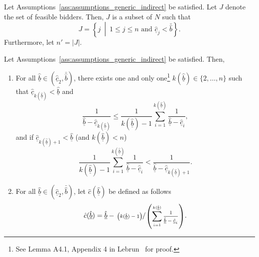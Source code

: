 \begin{define}
\label{def:feasible_bidders_indirect}
Let Assumptions~\ref{ass:assumptions_generic_indirect} be satisfied. Let $J$ denote the set of feasible bidders. Then, $J$ is a subset of $N$ such that
\begin{equation*}
  J = \left\{j \:\middle\vert\: 1\leq j\leq n \textrm{ and } \underline{\hat{c}}_j < \bar{\hat{b}}\right\}.
\end{equation*}
Furthermore, let $n' = |J|$.
\end{define}

\begin{define}
\label{def:lower_bound_bids_indirect}
Let Assumptions~\ref{ass:assumptions_generic_indirect} be satisfied. Then,
\begin{enumerate}
  \item For all $\underline{\hat{b}}\in (\underline{\hat{c}}_2, \bar{\hat{b}})$, there exists one and only one\footnote{See Lemma A4.1, Appendix 4 in Lebrun~\cite{Lebrun2004} for proof.} $k(\underline{\hat{b}})\in \{2,\dotsc,n\}$ such that $\underline{\hat{c}}_{k(\underline{\hat{b}})} < \underline{\hat{b}}$ and
  \begin{equation*}
    \frac{1}{\underline{\hat{b}} - \underline{\hat{c}}_{k(\underline{\hat{b}})}}\leq \frac{1}{k(\underline{\hat{b}}) - 1}\sum_{i=1}^{k(\underline{\hat{b}})}\frac{1}{\underline{\hat{b}} - \underline{\hat{c}}_i},
  \end{equation*}
  and if $\underline{\hat{c}}_{k(\underline{\hat{b}})+1} < \underline{\hat{b}}$ (and $k(\underline{\hat{b}}) < n$)
  \begin{equation*}
    \frac{1}{k(\underline{\hat{b}}) - 1}\sum_{i=1}^{k(\underline{\hat{b}})}\frac{1}{\underline{\hat{b}} - \underline{\hat{c}}_i} < \frac{1}{\underline{\hat{b}} - \underline{\hat{c}}_{k(\underline{\hat{b}})+1}}.
  \end{equation*}
  \item For all $\underline{\hat{b}}\in (\underline{\hat{c}}_2, \bar{\hat{b}})$, let $\hat{c}(\underline{\hat{b}})$ be defined as follows
  \begin{equation}
  \label{eq:lower_bound_bids_cost_indirect}
    \hat{c}(\underline{\hat{b}}) = \underline{\hat{b}} - \sfrac{\left(k(\underline{\hat{b}})-1\right)}{\left(\sum_{i=1}^{k(\underline{\hat{b}})} \frac{1}{\underline{\hat{b}} - \underline{\hat{c}}_i}\right)}.
  \end{equation}
\end{enumerate}
\end{define}
